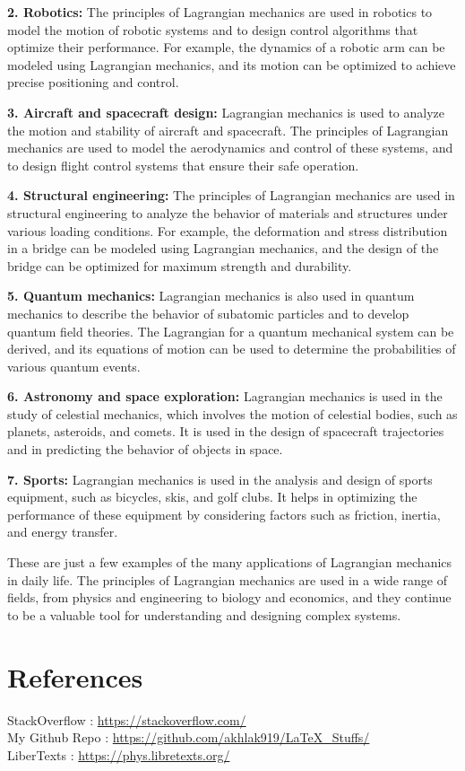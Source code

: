 \documentclass[12pt, a4paper]{article} %
\begin{document}
{\bf 2. Robotics:} The principles of Lagrangian mechanics are used in robotics to model the motion of robotic systems and to design control algorithms that optimize their performance. For example, the dynamics of a robotic arm can be modeled using Lagrangian mechanics, and its motion can be optimized to achieve precise positioning and control.

{\bf 3. Aircraft and spacecraft design:} Lagrangian mechanics is used to analyze the motion and stability of aircraft and spacecraft. The principles of Lagrangian mechanics are used to model the aerodynamics and control of these systems, and to design flight control systems that ensure their safe operation.

{\bf 4. Structural engineering:} The principles of Lagrangian mechanics are used in structural engineering to analyze the behavior of materials and structures under various loading conditions. For example, the deformation and stress distribution in a bridge can be modeled using Lagrangian mechanics, and the design of the bridge can be optimized for maximum strength and durability.

{\bf 5. Quantum mechanics:} Lagrangian mechanics is also used in quantum mechanics to describe the behavior of subatomic particles and to develop quantum field theories. The Lagrangian for a quantum mechanical system can be derived, and its equations of motion can be used to determine the probabilities of various quantum events.

{\bf 6. Astronomy and space exploration:} Lagrangian mechanics is used in the study of celestial mechanics, which involves the motion of celestial bodies, such as planets, asteroids, and comets. It is used in the design of spacecraft trajectories and in predicting the behavior of objects in space.

{\bf 7. Sports:} Lagrangian mechanics is used in the analysis and design of sports equipment, such as bicycles, skis, and golf clubs. It helps in optimizing the performance of these equipment by considering factors such as friction, inertia, and energy transfer.

These are just a few examples of the many applications of Lagrangian mechanics in daily life. The principles of Lagrangian mechanics are used in a wide range of fields, from physics and engineering to biology and economics, and they continue to be a valuable tool for understanding and designing complex systems.


\section{References}

StackOverflow : \url{https://stackoverflow.com/}\\
My Github Repo : \url{https://github.com/akhlak919/LaTeX_Stuffs/}\\
LiberTexts : \url{https://phys.libretexts.org/}
\end{document}
